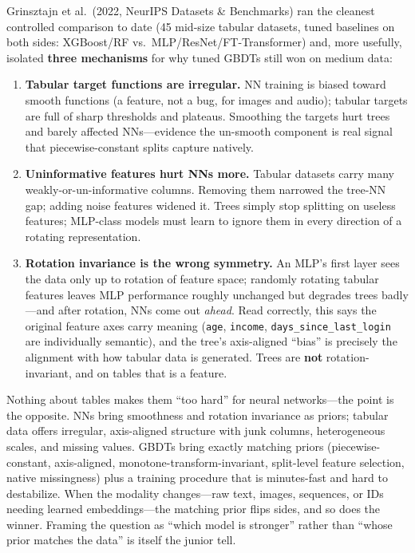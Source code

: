 Grinsztajn et al.\ (2022, NeurIPS Datasets \& Benchmarks) ran the cleanest controlled comparison to date (45 mid-size tabular datasets, tuned baselines on both sides: XGBoost/RF vs.\ MLP/ResNet/FT-Transformer) and, more usefully, isolated \textbf{three mechanisms} for why tuned GBDTs still won on medium data:
\begin{enumerate}
    \item \textbf{Tabular target functions are irregular.} NN training is biased toward smooth functions (a feature, not a bug, for images and audio); tabular targets are full of sharp thresholds and plateaus. Smoothing the targets hurt trees and barely affected NNs---evidence the un-smooth component is real signal that piecewise-constant splits capture natively.
    \item \textbf{Uninformative features hurt NNs more.} Tabular datasets carry many weakly-or-un-informative columns. Removing them narrowed the tree-NN gap; adding noise features widened it. Trees simply stop splitting on useless features; MLP-class models must learn to ignore them in every direction of a rotating representation.
    \item \textbf{Rotation invariance is the wrong symmetry.} An MLP's first layer sees the data only up to rotation of feature space; randomly rotating tabular features leaves MLP performance roughly unchanged but degrades trees badly---and after rotation, NNs come out \textit{ahead}. Read correctly, this says the original feature axes carry meaning (\texttt{age}, \texttt{income}, \texttt{days\_since\_last\_login} are individually semantic), and the tree's axis-aligned ``bias'' is precisely the alignment with how tabular data is generated. Trees are \textbf{not} rotation-invariant, and on tables that is a feature.
\end{enumerate}

\begin{keyinsight}
Nothing about tables makes them ``too hard'' for neural networks---the point is the opposite. NNs bring smoothness and rotation invariance as priors; tabular data offers irregular, axis-aligned structure with junk columns, heterogeneous scales, and missing values. GBDTs bring exactly matching priors (piecewise-constant, axis-aligned, monotone-transform-invariant, split-level feature selection, native missingness) plus a training procedure that is minutes-fast and hard to destabilize. When the modality changes---raw text, images, sequences, or IDs needing learned embeddings---the matching prior flips sides, and so does the winner. Framing the question as ``which model is stronger'' rather than ``whose prior matches the data'' is itself the junior tell.
\end{keyinsight}

